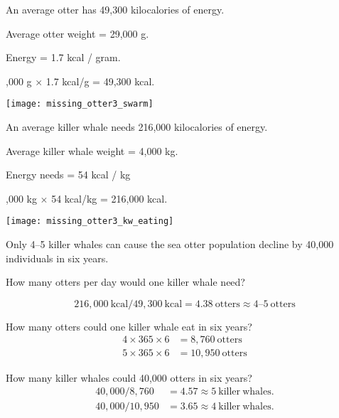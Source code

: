 \documentclass[t,handout]{beamer}  %
\begin{document}
\begin{frame}[t]{An average otter has 49,300 kilocalories of energy.}

	\begin{multicols}{2}
	
	\hangpara Average otter weight = 29,000 g.
	
	\hangpara Energy = 1.7 kcal / gram.

	,000 g $\times$ 1.7 kcal/g = 49,300 kcal.

	\columnbreak
	
		\texttt{[image: missing\_otter3\_swarm]}
		
	\end{multicols}
	
\end{frame}
%
\begin{frame}[t]{An average killer whale needs 216,000 kilocalories of energy.}

	\begin{multicols}{2}
	
	\hangpara Average killer whale weight = 4,000 kg.
	
	\hangpara Energy needs = 54 kcal / kg

	,000 kg $\times$ 54 kcal/kg = 216,000 kcal.

	\columnbreak
	
		\texttt{[image: missing\_otter3\_kw\_eating]}
		
	\end{multicols}
	
\end{frame}
%
\begin{frame}[t]{Only 4--5 killer whales can cause the sea otter population decline by 40,000 individuals in six years.}

	\vspace*{-\baselineskip}
	
	\hangpara How many otters per day would one killer whale need?
		
		\[216,000\ \mathrm{kcal} / 49,300\ \mathrm{kcal} = 4.38\ \mathrm{otters} \approx 4\mathrm{–}5\ \mathrm{otters}\]
		
	\pause
	\hangpara How many otters could one killer whale eat in six years?
	\begin{align*}4 \times 365 \times 6 &= 8,760\ \mathrm{otters}\\
	5 \times 365 \times 6 &= 10,950\ \mathrm{otters}\end{align*}

	\pause
	\hangpara How many killer whales could 40,000 otters in six years?
	\begin{align*}40,000 / 8,760 &= 4.57 \approx 5\ \mathrm{killer\ whales.}\\
	40,000 / 10,950 &= 3.65 \approx 4\ \mathrm{killer\ whales.}\end{align*}

\end{frame}
%
\end{document}
